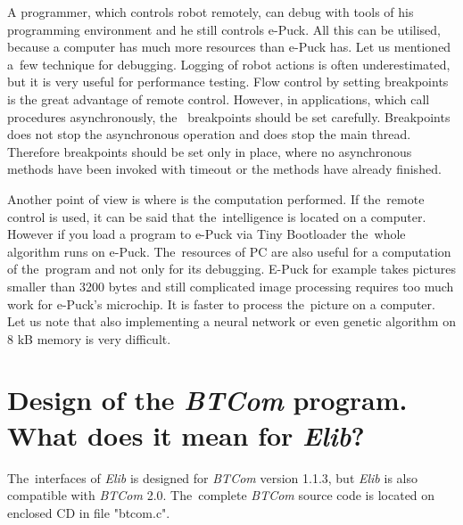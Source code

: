   A programmer, which controls robot remotely, can debug with tools of his programming environment and he still controls e-Puck.
  All this can be utilised, because a computer has much more resources than e-Puck has.
  Let us mentioned a~few  technique for debugging. Logging of robot actions is often underestimated,
  but it is very useful for performance testing. Flow control by setting breakpoints is the great advantage
  of remote control. However, in applications, which call procedures asynchronously, the~ breakpoints should be set carefully.
  Breakpoints does not stop the asynchronous operation and does stop the main thread.
  Therefore breakpoints should be set only in place, where no asynchronous methods have been invoked with timeout
  or the methods have already finished.
  
  Another point of view is where is the computation performed.
  If the~remote control is used, it can be said that the~intelligence 
  is located on a computer. However if you load a program to e-Puck via Tiny Bootloader the~whole algorithm
  runs on e-Puck.
  The~resources of PC are also useful for a computation of the~program and not only for
  its debugging. E-Puck for example takes pictures smaller than 3200 bytes and still complicated image processing 
  requires too much work for e-Puck's microchip. It is faster to process the~picture
  on a computer. Let us note that also implementing a neural network or even genetic algorithm on 8 kB memory
  is very difficult.

\section{Design of the {\it BTCom} program. What does it mean for {\it Elib}?}
  \label{sec:btcomdesign}
  The~interfaces of {\it Elib} is designed for {\it BTCom} version 1.1.3, but {\it Elib} is also compatible with {\it BTCom} 2.0.
  The~complete {\it BTCom} source code is located on enclosed CD in file "btcom.c".

